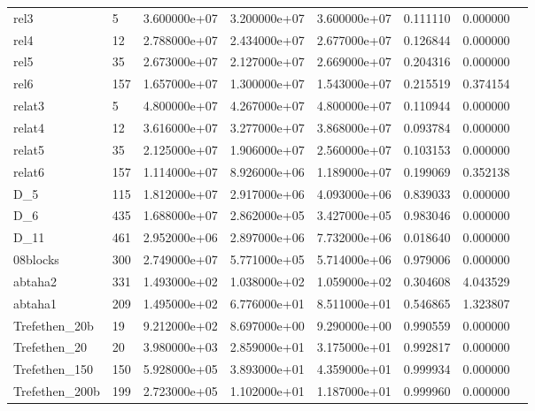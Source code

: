 \begin{tabular}{llrrrrrr}
rel3                    &    5 &  3.600000e+07 &  3.200000e+07 &  3.600000e+07 &  0.111110 &  0.000000 \\
rel4                    &   12 &  2.788000e+07 &  2.434000e+07 &  2.677000e+07 &  0.126844 &  0.000000 \\
rel5                    &   35 &  2.673000e+07 &  2.127000e+07 &  2.669000e+07 &  0.204316 &  0.000000 \\
rel6                    &  157 &  1.657000e+07 &  1.300000e+07 &  1.543000e+07 &  0.215519 &  0.374154 \\
relat3                  &    5 &  4.800000e+07 &  4.267000e+07 &  4.800000e+07 &  0.110944 &  0.000000 \\
relat4                  &   12 &  3.616000e+07 &  3.277000e+07 &  3.868000e+07 &  0.093784 &  0.000000 \\
relat5                  &   35 &  2.125000e+07 &  1.906000e+07 &  2.560000e+07 &  0.103153 &  0.000000 \\
relat6                  &  157 &  1.114000e+07 &  8.926000e+06 &  1.189000e+07 &  0.199069 &  0.352138 \\
D\_5                     &  115 &  1.812000e+07 &  2.917000e+06 &  4.093000e+06 &  0.839033 &  0.000000 \\
D\_6                     &  435 &  1.688000e+07 &  2.862000e+05 &  3.427000e+05 &  0.983046 &  0.000000 \\
D\_11                    &  461 &  2.952000e+06 &  2.897000e+06 &  7.732000e+06 &  0.018640 &  0.000000 \\
08blocks                &  300 &  2.749000e+07 &  5.771000e+05 &  5.714000e+06 &  0.979006 &  0.000000 \\
abtaha2                 &  331 &  1.493000e+02 &  1.038000e+02 &  1.059000e+02 &  0.304608 &  4.043529 \\
abtaha1                 &  209 &  1.495000e+02 &  6.776000e+01 &  8.511000e+01 &  0.546865 &  1.323807 \\
Trefethen\_20b           &   19 &  9.212000e+02 &  8.697000e+00 &  9.290000e+00 &  0.990559 &  0.000000 \\
Trefethen\_20            &   20 &  3.980000e+03 &  2.859000e+01 &  3.175000e+01 &  0.992817 &  0.000000 \\
Trefethen\_150           &  150 &  5.928000e+05 &  3.893000e+01 &  4.359000e+01 &  0.999934 &  0.000000 \\
Trefethen\_200b          &  199 &  2.723000e+05 &  1.102000e+01 &  1.187000e+01 &  0.999960 &  0.000000 \\

\end{tabular}
